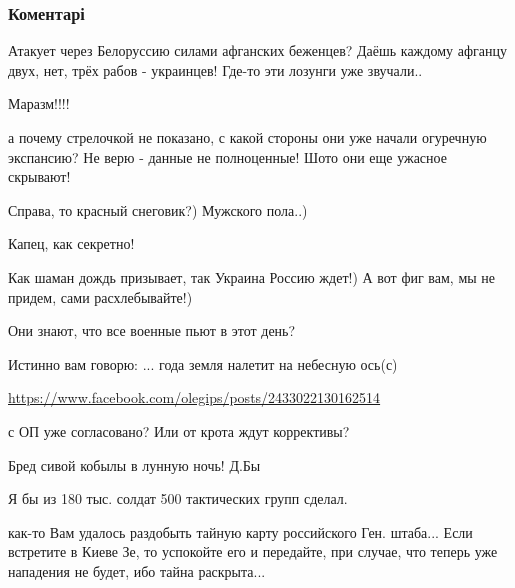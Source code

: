  
 
 
 
 
\subsubsection{Коментарі}

\begin{itemize} %

Атакует через Белоруссию силами афганских беженцев? Даёшь каждому афганцу двух,
нет, трёх рабов - украинцев! Где-то эти лозунги уже звучали..

Маразм!!!!


а почему стрелочкой не показано, с какой стороны они уже начали огуречную
экспансию? Не верю - данные не полноценные! Шото они еще ужасное скрывают!


Справа, то красный снеговик?)
Мужского пола..)

Капец, как секретно!

Как шаман дождь призывает, так Украина Россию ждет!) А вот фиг вам, мы не придем, сами расхлебывайте!)

Они знают, что все военные пьют в этот день?

Истинно вам говорю: ... года земля налетит на небесную ось(с)

\url{https://www.facebook.com/olegips/posts/2433022130162514}

с ОП уже согласовано? Или от крота ждут коррективы?

Бред сивой кобылы в лунную ночь! Д.Бы

Я бы из 180 тыс. солдат 500 тактических групп сделал.


как-то Вам удалось раздобыть тайную карту российского Ген. штаба... Если
встретите в Киеве Зе, то успокойте его и передайте, при случае, что теперь уже
нападения не будет, ибо тайна раскрыта...


\end{itemize}
